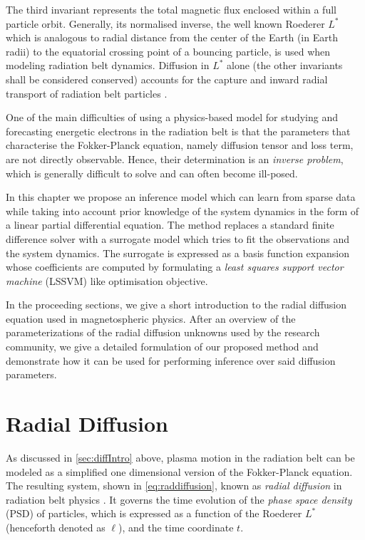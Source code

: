 The third invariant represents the total magnetic flux enclosed within a full particle orbit. 
Generally, its normalised inverse, the well known Roederer $L^{*}$ \citep{Roederer1970} which is 
analogous to radial distance from the center of the Earth (in Earth radii) to the equatorial 
crossing point of a bouncing particle, is used when modeling radiation belt dynamics. Diffusion in 
$L^{*}$ alone (the other invariants shall be considered conserved) accounts for the capture and 
inward radial transport of radiation belt particles \citep{Roederer1970,JGR:JGR4463}.

One of the main difficulties of using a physics-based model for studying and forecasting energetic 
electrons in the radiation belt is that the parameters that characterise the Fokker-Planck 
equation, namely diffusion tensor and loss term, are not directly observable. Hence, their 
determination is an \emph{inverse problem}, which is generally difficult to solve and can often 
become ill-posed.

In this chapter we propose an inference model which can learn from sparse data while taking into 
account prior knowledge of the system dynamics in the form of a linear partial differential 
equation. The method replaces a standard finite difference solver with a surrogate model which 
tries to fit the observations and the system dynamics. The surrogate is expressed as a basis 
function expansion whose coefficients are computed by formulating a 
\emph{least squares support vector machine} (LSSVM) like optimisation objective.

In the proceeding sections, we give a short introduction to the radial diffusion equation used in 
magnetospheric physics. After an overview of the parameterizations of the radial diffusion unknowns 
used by the research community, we give a detailed formulation of our proposed method and 
demonstrate how it can be used for performing inference over said diffusion parameters.

\section{Radial Diffusion}\label{sec:radDiffusionIntroduction}

As discussed in \cref{sec:diffIntro} above, plasma motion in the radiation belt can be 
modeled as a simplified one dimensional version of the Fokker-Planck equation. The resulting 
system, shown in \cref{eq:raddiffusion}, known as \emph{radial diffusion} in radiation belt 
physics \citep{JGRA:JGRA9345}. It governs the time evolution of the \emph{phase space density} 
(PSD) of particles, which is expressed as a function of the Roederer $L^{*}$ 
(henceforth denoted as $\ell$), and the time coordinate $t$.


